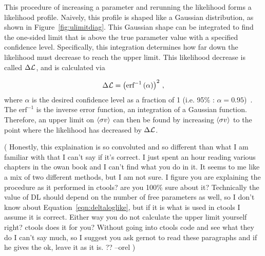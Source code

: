 This procedure of increasing a parameter and rerunning the likelihood forms a likelihood profile.
Naively, this profile is shaped like a Gaussian distribution, as shown in Figure~\ref{fig:ulimitdiag}.
This Gaussian shape can be integrated to find the one-sided limit that is above the true parameter value with a specified confidence level.
Specifically, this integration determines how far down the likelihood must decrease to reach the upper limit.
This likelihood decrease is called $\Delta\mathcal{L}$, and is calculated via

\begin{equation}\label{eqn:deltaloglike}
  \Delta\mathcal{L} = \left ( \textrm{erf}^{-1} \left ( \alpha \right ) \right )^2 \,,
\end{equation}
where $\alpha$ is the desired confidence level as a fraction of 1 (i.e. 95\% : $\alpha=0.95$)~\cite{wilks1938,cash1979}.
The $\textrm{erf}^{-1}$ is the inverse error function, an integration of a Gaussian function.
Therefore, an upper limit on $\left \langle \sigma v \right \rangle$ can then be found by increasing $\left \langle \sigma v \right \rangle$ to the point where the likelihood has decreased by $\Delta\mathcal{L}$.


%


{\color{red}(
  Honestly, this explaination is so convoluted and so different than what I am familiar with that I can't say if it's correct.
  I just spent an hour reading various chapters in the owan book and I can't find what you do in it.
  It seems to me like a mix of two different methods, but I am not sure.
  I figure you are explaining the procedure as it performed in ctools? are you 100\% sure about it?
  Technically the value of DL should depend on the number of free parameters as well, so I don't know about Equation~\ref{eqn:deltaloglike}, but if it is what is used in ctools I assume it is correct.
  Either way you do not calculate the upper limit yourself right? ctools does it for you?
  Without going into ctools code and see what they do I can't say much, so I suggest you ask gernot to read these paragraphs and if he gives the ok, leave it as it is.  ?? --orel
)}

